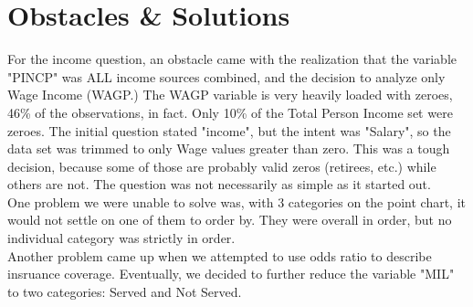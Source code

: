 \documentclass{article}
\begin{document}
\begin{figure}[ht!]
\begin{floatrow}
\end{floatrow}

\end{figure}



\section{Obstacles \& Solutions}
For the income question, an obstacle came with the realization that the variable "PINCP" was ALL income sources combined, and the decision to analyze only Wage Income (WAGP.) The WAGP variable is very heavily loaded with zeroes, 46\% of the observations, in fact. Only 10\% of the Total Person Income set were zeroes. The initial question stated "income", but the intent was "Salary", so the data set was trimmed to only Wage values greater than zero. This was a tough decision, because some of those are probably valid zeros (retirees, etc.) while others are not. The question was not necessarily as simple as it started out.\\

One problem we were unable to solve was, with 3 categories on the point chart, it would not settle on one of them to order by. They were overall in order, but no individual category was strictly in order.\\

Another problem came up when we attempted to use odds ratio to describe insruance coverage. Eventually, we decided to further reduce the variable "MIL" to two categories: Served and Not Served.
\end{document}
